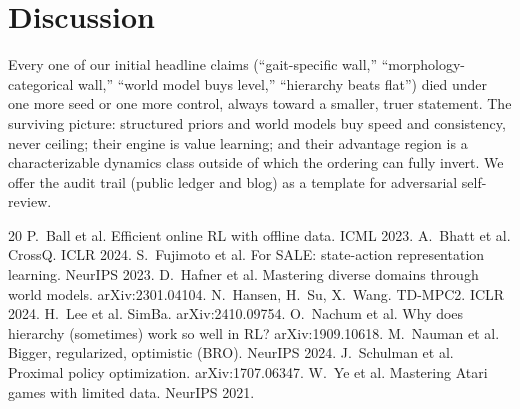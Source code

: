 \documentclass[10pt]{article}
\begin{document}
\section{Discussion}\label{sec:discussion}
Every one of our initial headline claims (``gait-specific wall,'' ``morphology-categorical wall,'' ``world
model buys level,'' ``hierarchy beats flat'') died under one more seed or one more control, always toward a
smaller, truer statement. The surviving picture: structured priors and world models buy speed and
consistency, never ceiling; their engine is value learning; and their advantage region is a characterizable
dynamics class outside of which the ordering can fully invert. We offer the audit trail (public ledger and
blog) as a template for adversarial self-review.


\begin{thebibliography}{20}
 P.~Ball et al. Efficient online RL with offline data. ICML 2023.
 A.~Bhatt et al. CrossQ. ICLR 2024.
 S.~Fujimoto et al. For SALE: state-action representation learning. NeurIPS 2023.
 D.~Hafner et al. Mastering diverse domains through world models. arXiv:2301.04104.
 N.~Hansen, H.~Su, X.~Wang. TD-MPC2. ICLR 2024.
 H.~Lee et al. SimBa. arXiv:2410.09754.
 O.~Nachum et al. Why does hierarchy (sometimes) work so well in RL? arXiv:1909.10618.
 M.~Nauman et al. Bigger, regularized, optimistic (BRO). NeurIPS 2024.
 J.~Schulman et al. Proximal policy optimization. arXiv:1707.06347.
 W.~Ye et al. Mastering Atari games with limited data. NeurIPS 2021.
\end{thebibliography}
\end{document}
